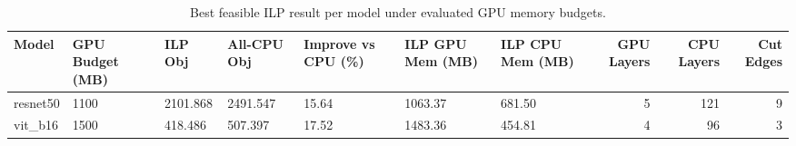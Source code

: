 \begin{table}[t]
\centering
\caption{Best feasible ILP result per model under evaluated GPU memory budgets.}
\label{tab:ilp-best-per-model}
\begin{tabular}{lllllllrrr}
\toprule
Model & GPU Budget (MB) & ILP Obj & All-CPU Obj & Improve vs CPU (\%) & ILP GPU Mem (MB) & ILP CPU Mem (MB) & GPU Layers & CPU Layers & Cut Edges \\
\midrule
resnet50 & 1100 & 2101.868 & 2491.547 & 15.64 & 1063.37 & 681.50 & 5 & 121 & 9 \\
vit_b16 & 1500 & 418.486 & 507.397 & 17.52 & 1483.36 & 454.81 & 4 & 96 & 3 \\
\bottomrule
\end{tabular}

\end{table}
